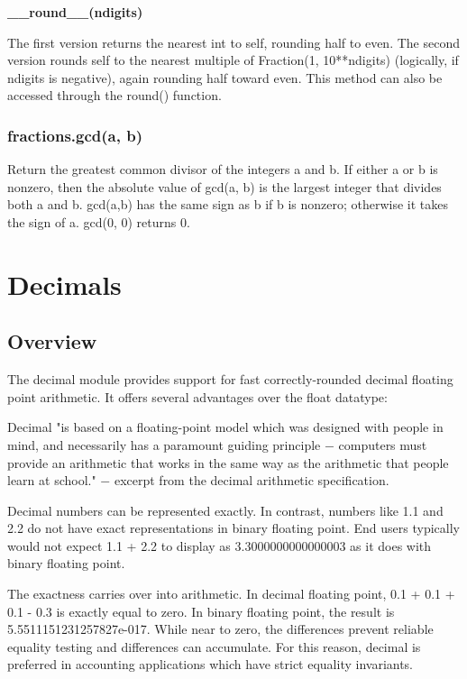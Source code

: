 \textbf{\_\_round\_\_(ndigits)}

The first version returns the nearest int to self, rounding half to even. The second version rounds self to the nearest multiple of Fraction(1, 10**ndigits) (logically, if ndigits is negative), again rounding half toward even. This method can also be accessed through the round() function.

\subsubsection{fractions.gcd(a, b)}

Return the greatest common divisor of the integers a and b. If either a or b is nonzero, then the absolute value of gcd(a, b) is the largest integer that divides both a and b. gcd(a,b) has the same sign as b if b is nonzero; otherwise it takes the sign of a. gcd(0, 0) returns 0.














\newpage
\section{Decimals}

\subsection{Overview}

The decimal module provides support for fast correctly-rounded decimal floating point arithmetic. It offers several advantages over the float datatype:

\vpara
Decimal "is based on a floating-point model which was designed with people in mind, and necessarily has a paramount guiding principle $-$ computers must provide an arithmetic that works in the same way as the arithmetic that people learn at school." $-$ excerpt from the decimal arithmetic specification.

\vpara
Decimal numbers can be represented exactly. In contrast, numbers like 1.1 and 2.2 do not have exact representations in binary floating point. End users typically would not expect 1.1 + 2.2 to display as 3.3000000000000003 as it does with binary floating point.

\vpara
The exactness carries over into arithmetic. In decimal floating point, 0.1 + 0.1 + 0.1 - 0.3 is exactly equal to zero. In binary floating point, the result is 5.5511151231257827e-017. While near to zero, the differences prevent reliable equality testing and differences can accumulate. For this reason, decimal is preferred in accounting applications which have strict equality invariants.

